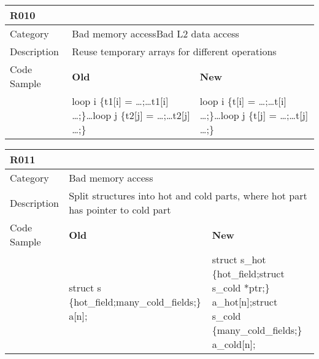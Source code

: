 \begin{tabular}{|p{0.9in}|p{2.0in}|p{2.0in}|} \hline
\textbf{R010}       & \multicolumn{2}{|p{4.0in}|}{} \\ \hline
Category            & \multicolumn{2}{|p{4.0in}|}{Bad memory access\newline Bad L2 data access} \\ \hline
Description         & \multicolumn{2}{|p{4.0in}|}{Reuse temporary arrays for different operations} \\ \hline
Code Sample         & \textbf{Old} & \textbf{New} \\ \hline
                    & loop i \{\newline   t1[i] = \ldots;\newline   \ldots t1[i] \ldots;\newline \}\newline \ldots\newline loop j \{\newline   t2[j] = \ldots;\newline   \ldots t2[j] \ldots;\newline \}\newline
                    & loop i \{\newline   t[i] = \ldots;\newline   \ldots t[i] \ldots;\newline \}\newline \ldots\newline loop j \{\newline   t[j] = \ldots;\newline   \ldots t[j] \ldots;\newline \} \\ \hline
\end{tabular}

\begin{tabular}{|p{0.9in}|p{2.0in}|p{2.0in}|} \hline
\textbf{R011}       & \multicolumn{2}{|p{4.0in}|}{} \\ \hline
Category            & \multicolumn{2}{|p{4.0in}|}{Bad memory access} \\ \hline
Description         & \multicolumn{2}{|p{4.0in}|}{Split structures into hot and cold parts, where hot part has pointer to cold part} \\ \hline
Code Sample         & \textbf{Old} & \textbf{New} \\ \hline
                    & struct s \{\newline   hot\_field;\newline   many\_cold\_fields;\newline \} a[n];
                    & struct s\_hot \{\newline   hot\_field;\newline   struct s\_cold *ptr;\newline \} a\_hot[n];\newline struct s\_cold \{\newline   many\_cold\_fields;\newline \} a\_cold[n]; \\ \hline
\end{tabular}

